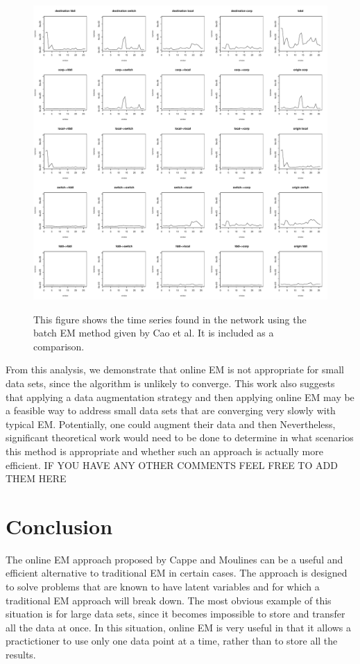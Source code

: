 \documentclass[12pt]{article}
\begin{document}
\begin{figure}[b!]
\centering
\includegraphics[width = 1\textwidth]{novelty_normal_em.PDF}\\
\caption{This figure shows the time series found in the network using the batch EM method given by Cao et al. It is included as a comparison.} \label{f2}
\end{figure}

From this analysis, we demonstrate that online EM is not appropriate for small data sets, since the algorithm is unlikely to converge. This work also suggests that applying a data augmentation strategy and then applying online EM may be a feasible way to address small data sets that are converging very slowly with typical EM. Potentially, one could augment their data and then  Nevertheless, significant theoretical work would need to be done to determine in what scenarios this method is appropriate and whether such an approach is actually more efficient. IF YOU HAVE ANY OTHER COMMENTS FEEL FREE TO ADD THEM HERE

\clearpage
\section{Conclusion}
The online EM approach proposed by Cappe and Moulines can be a useful and efficient alternative to traditional EM in certain cases. The approach is designed to solve problems that are known to have latent variables and for which a traditional EM approach will break down. The most obvious example of this situation is for large data sets, since it becomes impossible to store and transfer all the data at once. In this situation, online EM is very useful in that it allows a practictioner to use only one data point at a time, rather than to store all the results. \\
\end{document}
